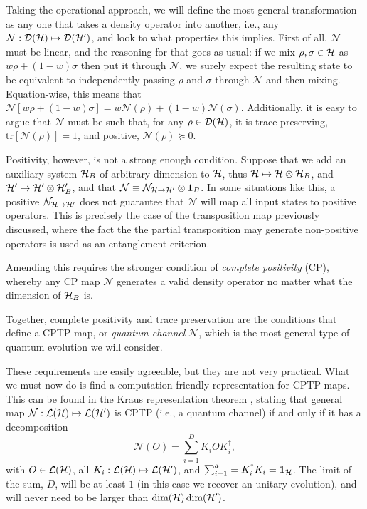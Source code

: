 		Taking the operational approach, we will define the most general transformation as any one that takes a density operator into another, i.e., any $\mathcal{N} : \mathcal{D}(\mathcal{H}) \mapsto \mathcal{D}(\mathcal{H}^\prime)$, and look to what properties this implies. First of all, $\mathcal{N}$ must be linear, and the reasoning for that goes as usual: if we mix $\rho, \sigma \in \mathcal{H}$ as $w \rho + (1-w) \sigma$ then put it through $\mathcal{N}$, we surely expect the resulting state to be equivalent to independently passing $\rho$ and $\sigma$ through $\mathcal{N}$ and then mixing. Equation-wise, this means that $\mathcal{N} \left[ w \rho + (1-w) \sigma \right] = w \mathcal{N}(\rho) + (1-w) \mathcal{N}(\sigma)$. Additionally, it is easy to argue that $\mathcal{N}$ must be such that, for any $\rho \in \mathcal{D}(\mathcal{H})$, it is trace-preserving, $\text{tr}\left[ \mathcal{N}(\rho) \right] = 1$, and positive, $\mathcal{N}(\rho) \succeq 0$.
		
		Positivity, however, is not a strong enough condition. Suppose that we add an auxiliary system $\mathcal{H}_B$ of arbitrary dimension to $\mathcal{H}$, thus $\mathcal{H} \mapsto \mathcal{H} \otimes \mathcal{H}_B$, and $\mathcal{H}^\prime \mapsto \mathcal{H}^\prime \otimes \mathcal{H}^\prime_B$, and that $\mathcal{N} \equiv \mathcal{N}_{\mathcal{H} \rightarrow \mathcal{H}^\prime} \otimes \mathbf{1}_B$. In some situations like this, a positive $\mathcal{N}_{\mathcal{H} \rightarrow \mathcal{H}^\prime}$ does not guarantee that $\mathcal{N}$ will map all input states to positive operators. This is precisely the case of the transposition map previously discussed, where the fact the the partial transposition may generate non-positive operators is used as an entanglement criterion. 
		
		Amending this requires the stronger condition of \emph{complete positivity} (CP), whereby any CP map $\mathcal{N}$ generates a valid density operator no matter what the dimension of $\mathcal{H}_B$ is.
		
		Together, complete positivity and trace preservation are the conditions that define a CPTP map, or \emph{quantum channel} $\mathcal{N}$, which is the most general type of quantum evolution we will consider.
		
		These requirements are easily agreeable, but they are not very practical. What we must now do is find a computation-friendly representation for CPTP maps. This can be found in the Kraus representation theorem \cite{wilde_2013_book}, stating that general map $\mathcal{N} : \mathcal{L}(\mathcal{H}) \mapsto \mathcal{L}(\mathcal{H}^\prime)$ is CPTP (i.e., a quantum channel) if and only if it has a decomposition
		$$
			\mathcal{N}(O) = \sum_{i=1}^D K_i O K_i^\dagger ,
		$$
		with $O \in \mathcal{L}(\mathcal{H})$, all $K_i : \mathcal{L}(\mathcal{H}) \mapsto \mathcal{L}(\mathcal{H}^\prime)$, and $\sum_{i=1}^d = K_i^\dagger K_i = \mathbf{1}_{\mathcal{H}}$. The limit of the sum, $D$, will be at least $1$ (in this case we recover an unitary evolution), and will never need to be larger than $\text{dim}(\mathcal{H}) \,\text{dim}(\mathcal{H}^\prime)$.
		
